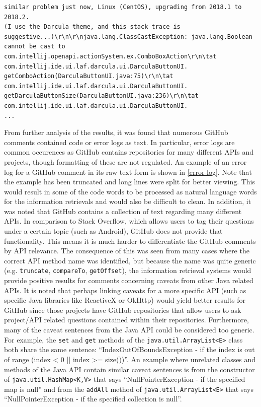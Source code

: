 \begin{lstlisting}[label=error-log,caption={Example of a GitHub comment containing an error log from \url{https://github.com/ChrisRM/material-theme-jetbrains/issues/863}},float,frame=tb,numbers=none,language=None]
similar problem just now, Linux (CentOS), upgrading from 2018.1 to 2018.2. 
(I use the Darcula theme, and this stack trace is suggestive...)\r\n\r\njava.lang.ClassCastException: java.lang.Boolean cannot be cast to com.intellij.openapi.actionSystem.ex.ComboBoxAction\r\n\tat com.intellij.ide.ui.laf.darcula.ui.DarculaButtonUI.
getComboAction(DarculaButtonUI.java:75)\r\n\tat com.intellij.ide.ui.laf.darcula.ui.DarculaButtonUI.
getDarculaButtonSize(DarculaButtonUI.java:236)\r\n\tat com.intellij.ide.ui.laf.darcula.ui.DarculaButtonUI.
...
\end{lstlisting}

From further analysis of the results, it was found that numerous GitHub comments contained code or error logs as text. In particular, error logs are common occurences as GitHub contains repositories for many different APIs and projects, though formatting of these are not regulated. An example of an error log for a GitHub comment in its raw text form is shown in \ref{error-log}. Note that the example has been truncated and long lines were split for better viewing. This would result in some of the code words to be processed as natural language words for the information retrievals and would also be difficult to clean. In addition, it was noted that GitHub contains a collection of text regarding many different APIs. In comparison to Stack Overflow, which allows users to tag their questions under a certain topic (such as Android), GitHub does not provide that functionality. This means it is much harder to differentiate the GitHub comments by API relevance. The consequence of this was seen from many cases where the correct API method name was identified, but because the name was quite generic (e.g. \lstinline{truncate}, \lstinline{compareTo}, \lstinline{getOffset}), the information retrieval systems would provide positive results for comments concerning caveats from other Java related APIs. It is noted that perhaps linking caveats for a more specific API (such as specific Java libraries like ReactiveX or OkHttp) would yield better results for GitHub since those projects have GitHub repositories that allow users to ask project/API related questions contained within their repositories. Furthermore, many of the caveat sentences from the Java API could be considered too generic. For example, the \lstinline{set} and \lstinline{get} methods of the \lstinline{java.util.ArrayList<E>} class both share the same sentence: ``IndexOutOfBoundsException - if the index is out of range (index < 0 || index >= size())''. An example where unrelated classes and methods of the Java API contain similar caveat sentences is from the constructor of \lstinline{java.util.HashMap<K,V>} that says ``NullPointerException - if the specified map is null'' and from the \lstinline{addAll} method of \lstinline{java.util.ArrayList<E>} that says ``NullPointerException - if the specified collection is null''. \\

